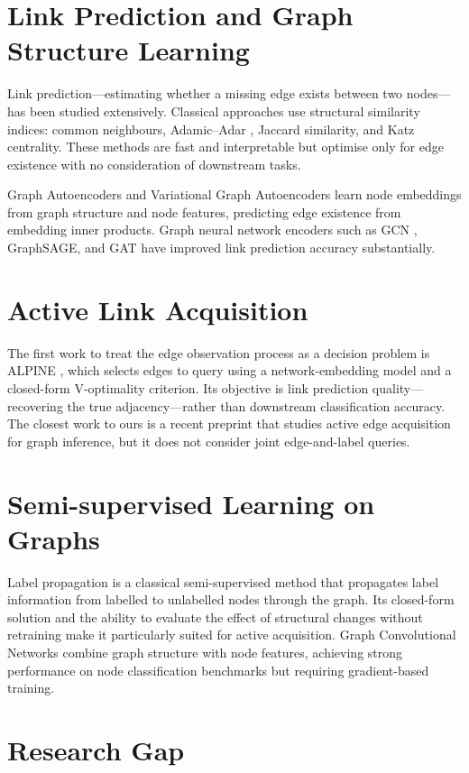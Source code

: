 \documentclass[12pt,a4paper,oneside]{report}
\begin{document}
\section{Link Prediction and Graph Structure Learning}

Link prediction---estimating whether a missing edge exists between two nodes---has been studied extensively. Classical approaches use structural similarity indices: common neighbours, Adamic--Adar \citep{adamic}, Jaccard similarity, and Katz centrality. These methods are fast and interpretable but optimise only for edge existence with no consideration of downstream tasks.

Graph Autoencoders and Variational Graph Autoencoders \citep{kipf_vgae} learn node embeddings from graph structure and node features, predicting edge existence from embedding inner products. Graph neural network encoders such as GCN \citep{kipf}, GraphSAGE, and GAT have improved link prediction accuracy substantially.

\section{Active Link Acquisition}

The first work to treat the edge observation process as a decision problem is ALPINE \citep{alpine}, which selects edges to query using a network-embedding model and a closed-form V-optimality criterion. Its objective is link prediction quality---recovering the true adjacency---rather than downstream classification accuracy. The closest work to ours is a recent preprint \citep{scout} that studies active edge acquisition for graph inference, but it does not consider joint edge-and-label queries.

\section{Semi-supervised Learning on Graphs}

Label propagation \citep{zhu} is a classical semi-supervised method that propagates label information from labelled to unlabelled nodes through the graph. Its closed-form solution and the ability to evaluate the effect of structural changes without retraining make it particularly suited for active acquisition. Graph Convolutional Networks \citep{kipf} combine graph structure with node features, achieving strong performance on node classification benchmarks but requiring gradient-based training.

\section{Research Gap}
\end{document}
